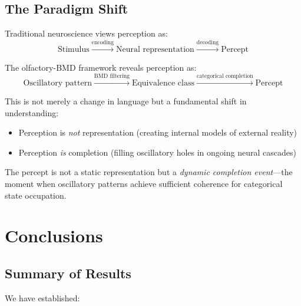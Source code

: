 \documentclass[11pt]{article}
\theoremstyle{remark}
\begin{document}
\subsection{The Paradigm Shift}

Traditional neuroscience views perception as:
\begin{equation}
\text{Stimulus} \xrightarrow{\text{encoding}} \text{Neural representation} \xrightarrow{\text{decoding}} \text{Percept}
\end{equation}

The olfactory-BMD framework reveals perception as:
\begin{equation}
\text{Oscillatory pattern} \xrightarrow{\text{BMD filtering}} \text{Equivalence class} \xrightarrow{\text{categorical completion}} \text{Percept}
\end{equation}

This is not merely a change in language but a fundamental shift in understanding:
\begin{itemize}
\item Perception is \textit{not} representation (creating internal models of external reality)
\item Perception \textit{is} completion (filling oscillatory holes in ongoing neural cascades)
\end{itemize}

The percept is not a static representation but a \textit{dynamic completion event}—the moment when oscillatory patterns achieve sufficient coherence for categorical state occupation.

\section{Conclusions}

\subsection{Summary of Results}

We have established:
\end{document}
